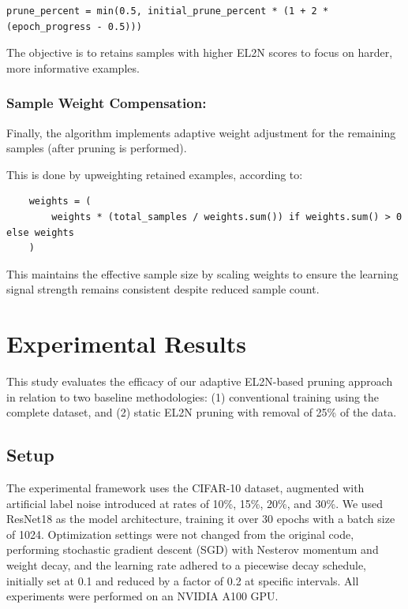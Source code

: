 \documentclass{article}
\begin{document}
\begin{verbatim}
prune_percent = min(0.5, initial_prune_percent * (1 + 2 * (epoch_progress - 0.5)))
\end{verbatim}

The objective is to retains samples with higher EL2N scores to focus on harder, more informative examples.

\subsubsection{Sample Weight Compensation:}
Finally, the algorithm implements adaptive weight adjustment for the remaining samples (after pruning is performed). 

This is done by upweighting retained examples, according to: 
\begin{verbatim}
    weights = (
        weights * (total_samples / weights.sum()) if weights.sum() > 0 else weights
    )
\end{verbatim}

This maintains the effective sample size by scaling weights to ensure the learning signal strength remains consistent despite reduced sample count.
    
\section{Experimental Results}

This study evaluates the efficacy of our adaptive EL2N-based pruning approach in relation to two baseline methodologies: (1) conventional training using the complete dataset, and (2) static EL2N pruning with removal of 25\% of the data. 

\subsection{Setup}

The experimental framework uses the CIFAR-10 dataset, augmented with artificial label noise introduced at rates of 10\%, 15\%, 20\%, and 30\%. We used ResNet18 as the model architecture, training it over 30 epochs with a batch size of 1024. Optimization settings were not changed from the original code, performing stochastic gradient descent (SGD) with Nesterov momentum and weight decay, and the learning rate adhered to a piecewise decay schedule, initially set at 0.1 and reduced by a factor of 0.2 at specific intervals. All experiments were performed on an NVIDIA A100 GPU.
\end{document}
